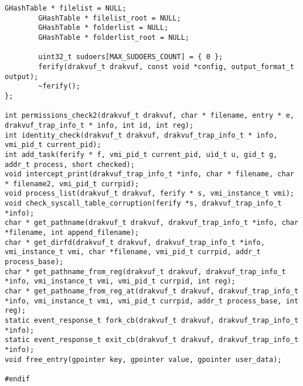 {\begin{lstlisting}[style=CStyle]
		GHashTable * filelist = NULL;
		GHashTable * filelist_root = NULL;
		GHashTable * folderlist = NULL;
		GHashTable * folderlist_root = NULL;

		uint32_t sudoers[MAX_SUDOERS_COUNT] = { 0 };
		ferify(drakvuf_t drakvuf, const void *config, output_format_t output);
		~ferify();
};

int permissions_check2(drakvuf_t drakvuf, char * filename, entry * e, drakvuf_trap_info_t * info, int id, int reg);
int identity_check(drakvuf_t drakvuf, drakvuf_trap_info_t * info, vmi_pid_t current_pid);
int add_task(ferify * f, vmi_pid_t current_pid, uid_t u, gid_t g, addr_t process, short checked);
void intercept_print(drakvuf_trap_info_t *info, char * filename, char * filename2, vmi_pid_t currpid);
void process_list(drakvuf_t drakvuf, ferify * s, vmi_instance_t vmi);
void check_syscall_table_corruption(ferify *s, drakvuf_trap_info_t *info);
char * get_pathname(drakvuf_t drakvuf, drakvuf_trap_info_t *info, char *filename, int append_filename);
char * get_dirfd(drakvuf_t drakvuf, drakvuf_trap_info_t *info, vmi_instance_t vmi, char *filename, vmi_pid_t currpid, addr_t process_base);
char * get_pathname_from_reg(drakvuf_t drakvuf, drakvuf_trap_info_t *info, vmi_instance_t vmi, vmi_pid_t currpid, int reg);
char * get_pathname_from_reg_at(drakvuf_t drakvuf, drakvuf_trap_info_t *info, vmi_instance_t vmi, vmi_pid_t currpid, addr_t process_base, int reg);
static event_response_t fork_cb(drakvuf_t drakvuf, drakvuf_trap_info_t *info);
static event_response_t exit_cb(drakvuf_t drakvuf, drakvuf_trap_info_t *info);
void free_entry(gpointer key, gpointer value, gpointer user_data);

#endif

\end{lstlisting}}

